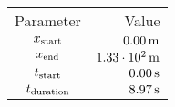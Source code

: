 \begin{tabular}{cr}
    \toprule
    Parameter & Value \\ \otoprule
    $x_{\textup{start}}$    & $\unit[0.00]{m}$ \\
    $x_{\textup{end}}$      & $\unit[1.33 \cdot 10^{2}]{m}$ \\
    $t_{\textup{start}}$    & $\unit[0.00]{s}$ \\
    $t_{\textup{duration}}$ & $\unit[8.97]{s}$ \\
    \bottomrule
\end{tabular}
